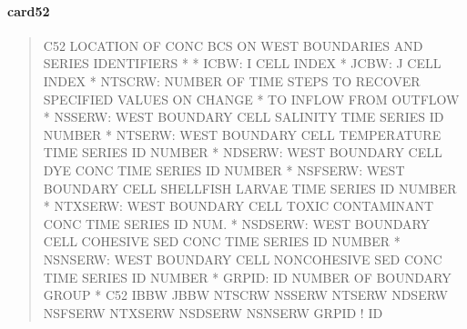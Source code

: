 \documentclass[letterpaper,10pt,english]{sphinxmanual}
\begin{document}
\paragraph{card52}
\label{\detokenize{inputfiles/runcontrol/card52:card52}}\label{\detokenize{inputfiles/runcontrol/card52::doc}}\begin{quote}

\begin{sphinxVerbatim}[commandchars=\\\{\}]
\PYGZhy{}\PYGZhy{}\PYGZhy{}\PYGZhy{}\PYGZhy{}\PYGZhy{}\PYGZhy{}\PYGZhy{}\PYGZhy{}\PYGZhy{}\PYGZhy{}\PYGZhy{}\PYGZhy{}\PYGZhy{}\PYGZhy{}\PYGZhy{}\PYGZhy{}\PYGZhy{}\PYGZhy{}\PYGZhy{}\PYGZhy{}\PYGZhy{}\PYGZhy{}\PYGZhy{}\PYGZhy{}\PYGZhy{}\PYGZhy{}\PYGZhy{}\PYGZhy{}\PYGZhy{}\PYGZhy{}\PYGZhy{}\PYGZhy{}\PYGZhy{}\PYGZhy{}\PYGZhy{}\PYGZhy{}\PYGZhy{}\PYGZhy{}\PYGZhy{}\PYGZhy{}\PYGZhy{}\PYGZhy{}\PYGZhy{}\PYGZhy{}\PYGZhy{}\PYGZhy{}\PYGZhy{}\PYGZhy{}\PYGZhy{}\PYGZhy{}\PYGZhy{}\PYGZhy{}\PYGZhy{}\PYGZhy{}\PYGZhy{}\PYGZhy{}\PYGZhy{}\PYGZhy{}\PYGZhy{}\PYGZhy{}\PYGZhy{}\PYGZhy{}\PYGZhy{}\PYGZhy{}\PYGZhy{}\PYGZhy{}\PYGZhy{}\PYGZhy{}\PYGZhy{}\PYGZhy{}\PYGZhy{}\PYGZhy{}\PYGZhy{}\PYGZhy{}\PYGZhy{}\PYGZhy{}\PYGZhy{}
C52 LOCATION OF CONC BC\PYGZsq{}S ON WEST BOUNDARIES AND SERIES IDENTIFIERS
*
*  ICBW:    I CELL INDEX
*  JCBW:    J CELL INDEX
*  NTSCRW:  NUMBER OF TIME STEPS TO RECOVER SPECIFIED VALUES ON CHANGE
*           TO INFLOW FROM OUTFLOW
*  NSSERW:  WEST BOUNDARY CELL SALINITY TIME SERIES ID NUMBER
*  NTSERW:  WEST BOUNDARY CELL TEMPERATURE TIME SERIES ID NUMBER
*  NDSERW:  WEST BOUNDARY CELL DYE CONC TIME SERIES ID NUMBER
*  NSFSERW: WEST BOUNDARY CELL SHELLFISH LARVAE TIME SERIES ID NUMBER
*  NTXSERW: WEST BOUNDARY CELL TOXIC CONTAMINANT CONC TIME SERIES ID NUM.
*  NSDSERW: WEST BOUNDARY CELL COHESIVE SED CONC TIME SERIES ID NUMBER
*  NSNSERW: WEST BOUNDARY CELL NON\PYGZhy{}COHESIVE SED CONC TIME SERIES ID NUMBER
*    GRPID: ID NUMBER OF BOUNDARY GROUP
*
C52    IBBW    JBBW  NTSCRW  NSSERW  NTSERW  NDSERW NSFSERW NTXSERW NSDSERW NSNSERW      GRPID ! ID
\end{sphinxVerbatim}
\end{quote}
\end{document}
